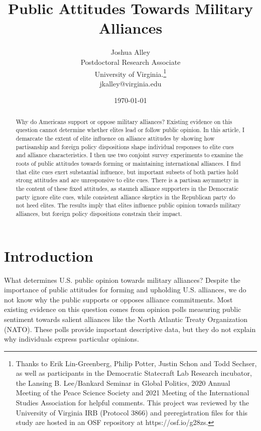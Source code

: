 \documentclass[12pt]{article}
\title{\textbf{Public Attitudes Towards Military Alliances}}
\author{Joshua Alley \\
Postdoctoral Research Associate \\
University of Virginia.\thanks{Thanks to Erik Lin-Greenberg, Philip Potter, Justin Schon and Todd Sechser, as well as participants in the Democratic Statecraft Lab Research incubator, the Lansing B. Lee/Bankard Seminar in Global Politics, 2020 Annual Meeting of the Peace Science Society and 2021 Meeting of the International Studies Association for helpful comments. This project was reviewed by the University of Virginia IRB (Protocol 3866) and preregistration files for this study are hosted in an OSF repository at https://osf.io/g28zs.} \\
jkalley@virginia.edu
}
\date{\today}
\begin{document}
\maketitle 

\doublespace 

\begin{abstract}
Why do Americans support or oppose military alliances? 
Existing evidence on this question cannot determine whether elites lead or follow public opinion. 
In this article, I demarcate the extent of elite influence on alliance attitudes by showing how partisanship and foreign policy dispositions shape individual responses to elite cues and alliance characteristics. 
I then use two conjoint survey experiments to examine the roots of public attitudes towards forming or maintaining international alliances.  
I find that elite cues exert substantial influence, but important subsets of both parties hold strong attitudes and are unresponsive to elite cues. 
There is a partisan asymmetry in the content of these fixed attitudes, as staunch alliance supporters in the Democratic party ignore elite cues, while consistent alliance skeptics in the Republican party do not heed elites.  
The results imply that elites influence public opinion towards military alliances, but foreign policy dispositions constrain their impact.  
\end{abstract}


\newpage 


\section{Introduction}

What determines U.S. public opinion towards military alliances? 
Despite the importance of public attitudes for forming and upholding U.S. alliances, we do not know why the public supports or opposes alliance commitments. 
Most existing evidence on this question comes from opinion polls measuring public sentiment towards salient alliances like the North Atlantic Treaty Organization (NATO).
These polls provide important descriptive data, but they do not explain why individuals express particular opinions. 
\end{document}
